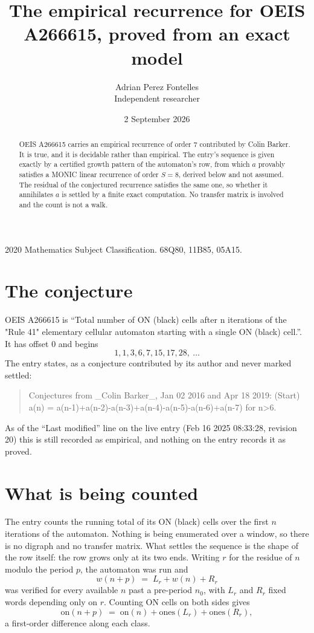 \documentclass[11pt,a4paper]{article}
\title{The empirical recurrence for OEIS A266615, proved from an exact model}
\author{Adrian Perez Fontelles\\ \small Independent researcher}
\date{2 September 2026}
\theoremstyle{plain}
\theoremstyle{definition}
\begin{document}
\maketitle

\begin{abstract}
OEIS A266615 carries an empirical recurrence of order $7$ contributed by Colin Barker. It is true, and it is
decidable rather than empirical. The entry's sequence is given exactly by a certified growth pattern of the automaton's row, from
which $a$ provably satisfies a MONIC linear recurrence of order $S=8$, derived below and not
assumed. The residual of the conjectured recurrence satisfies the same one, so whether it
annihilates $a$ is settled by a finite exact computation. No transfer matrix is involved and
the count is not a walk.
\end{abstract}

\noindent\small 2020 Mathematics Subject Classification. 68Q80, 11B85, 05A15.\normalsize

\section{The conjecture}

OEIS A266615 is ``Total number of ON (black) cells after n iterations of the "Rule 41" elementary cellular automaton starting with a single ON (black) cell.''. It has offset $0$ and begins
\[
1, 1, 3, 6, 7, 15, 17, 28,\ \dots
\]
The entry states, as a conjecture contributed by its author and never marked settled:
\begin{quote}
Conjectures from \_Colin Barker\_, Jan 02 2016 and Apr 18 2019: (Start) a(n) = a(n-1)+a(n-2)-a(n-3)+a(n-4)-a(n-5)-a(n-6)+a(n-7) for n>6.
\end{quote}
As of the ``Last modified'' line on the live entry (Feb 16 2025 08:33:28, revision 20)
this is still recorded as empirical, and nothing on the entry records it as proved.

\section{What is being counted}

The entry counts the running total of its ON (black) cells over the first $n$ iterations of the automaton. Nothing is being enumerated over a window, so there is
no digraph and no transfer matrix. What settles the sequence is the shape of the row itself:
the row grows only at its two ends. Writing
$r$ for the residue of $n$ modulo the period $p$, the automaton was run and
\[
w(n+p)\;=\;L_r + w(n) + R_r
\]
was verified for every available $n$ past a
pre-period $n_0$, with $L_r$ and $R_r$ fixed words depending only on $r$. Counting ON cells on
both sides gives
\[
\mathrm{on}(n+p)\;=\;\mathrm{on}(n)+\mathrm{ones}(L_r)+\mathrm{ones}(R_r),
\]
a first-order difference along each class.
\end{document}

